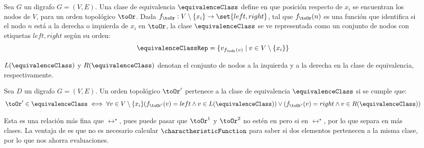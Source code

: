 \begin{definition} \label{equivalenceClassDefinition}
    Sea $G$ un digrafo $G = (V, E)$. Una clase de equivalencia $\equivalenceClass$ define en que posición respecto de $x_i$ se encuentran los nodos de $V$, para un orden topológico $\toOr$. Dada $f_{\toOr}:V \setminus \{x_i\} \to \set{left, right}$, tal que $f_{\toOr}(n)$ es una función que identifica si el nodo $n$ está a la derecha o izquierda de $x_i$ en $\toOr$, la clase  $\equivalenceClass$ se ve representada como un conjunto de nodos con etiquetas $left, right$ según su orden:
    $$
    \equivalenceClassRep = \{ v_{f_{\toOr}(v)} \mid v \in V \setminus \{x_i\} \}
    $$

    
    $L(\equivalenceClass)$ y $R(\equivalenceClass)$ denotan el conjunto de nodos a la izquierda y a la derecha en la clase de equivalencia, respectivamente.
\end{definition}

\begin{definition}
     Sea $D$ un digrafo $G = (V, E)$. Un orden topológico $\toOr'$ pertenece a la clase de equivalencia $\equivalenceClass$ si se cumple que: %
    $$
     \toOr' \in \equivalenceClass \iff \forall v \in V \setminus \{x_i\} (f_{\toOr'}(v) = left \land v \in L(\equivalenceClass) ) \lor (f_{\toOr'}(v) = right \land v \in R(\equivalenceClass) )
    $$
\end{definition}


Esta es una relación más fina que $\rel^\star$, pues puede pasar que $\toOr^1$ y $\toOr^2$ no estén en \rel{} pero si en $\rel^\star$, por lo que separa en más clases. La ventaja de \rel{} es que no es necesario calcular $\charactheristicFunction$ para saber si dos elementos pertenecen a la misma clase, por lo que nos ahorra evaluaciones. 

